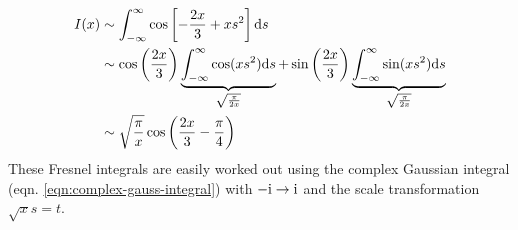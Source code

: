\begin{align*}
	I(x) &\sim \int_{-\infty}^{\infty}  \cos \left[-\frac{2x}{3} + xs^2\right] \mathrm{d} s \\
	& \sim \cos \left(\frac{2x}{3}\right) \underbrace{\int_{-\infty}^{\infty}\cos (xs^2) \mathrm{d} s}_{\sqrt{\frac{\pi}{2x}}} + \sin \left(\frac{2x}{3}\right) \underbrace{\int_{-\infty}^{\infty}\sin (xs^2) \mathrm{d} s}_{\sqrt{\frac{\pi}{2x}}} \\
	& \sim \sqrt{\frac{\pi}{x}}\cos \left(\frac{2x}{3} - \frac{\pi}{4}\right)
\end{align*}
These Fresnel integrals are easily worked out using the complex Gaussian integral (eqn. \ref{eqn:complex-gauss-integral}) with $-\mathrm{i} \rightarrow \mathrm{i}$ and the scale transformation $\sqrt{x}s=t$. 


